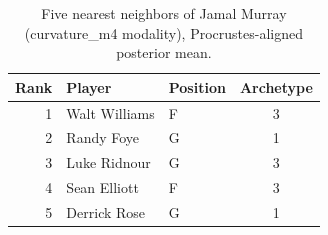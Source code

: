 \begin{table}[htbp]
  \centering\small
  \begin{tabular}{rllc}
    \toprule
    Rank & Player & Position & Archetype \\
    \midrule
    1 & Walt Williams & F & 3 \\
    2 & Randy Foye & G & 1 \\
    3 & Luke Ridnour & G & 3 \\
    4 & Sean Elliott & F & 3 \\
    5 & Derrick Rose & G & 1 \\
    \bottomrule
  \end{tabular}
  \caption{Five nearest neighbors of Jamal Murray (curvature_m4 modality), Procrustes-aligned posterior mean.}
  \label{tab:Jamal_Murray_neighbors_curvature_m4}
\end{table}

